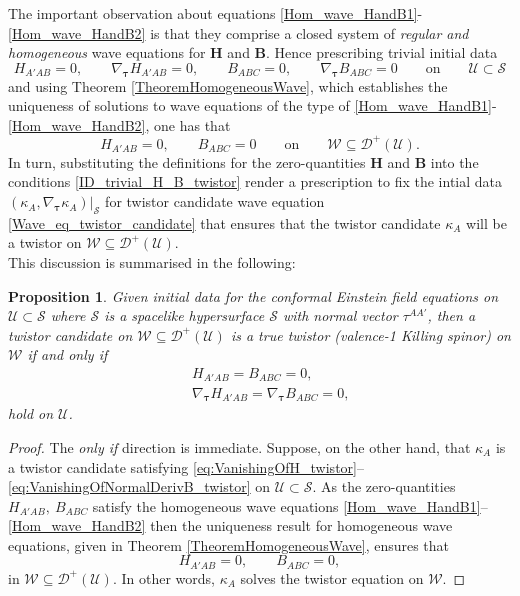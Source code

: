 \documentclass[10pt,a4paper]{article}
\theoremstyle{plain}
\newtheorem{proposition}{Proposition}
\def\bmB{{\bm B}}
\def\bmH{{\bm H}}
\begin{document}
The important observation about equations
\eqref{Hom_wave_HandB1}-\eqref{Hom_wave_HandB2} is that they comprise
a closed system of \emph{regular and homogeneous} wave equations for
$\bmH$ and $\bmB$.  Hence prescribing trivial initial data
\[
H_{A'AB}=0, \qquad \nabla_{\bm\tau} H_{A'AB}=0, \qquad B_{ABC}=0,
\qquad \nabla_{\bm\tau} B_{ABC}=0 \qquad \text{on} \qquad
\mathcal{U}\subset\mathcal{S}
\]
and using Theorem \ref{TheoremHomogeneousWave}, which establishes the
uniqueness of solutions to wave equations of the type of
\eqref{Hom_wave_HandB1}-\eqref{Hom_wave_HandB2}, one has that
\begin{equation}\label{ID_trivial_H_B_twistor}
H_{A'AB}=0, \qquad B_{ABC}=0 \qquad \text{on} \qquad \mathcal{W}\subseteq
\mathcal{D}^{+}(\mathcal{U}) .
\end{equation}
In turn, substituting the definitions for the zero-quantities $\bmH$
and $\bmB$ into the conditions \eqref{ID_trivial_H_B_twistor} render a
prescription to fix the intial data $(\kappa_A, \nabla_{\bm\tau}
\kappa_A)|_\mathcal{S}$ for twistor candidate wave equation
\eqref{Wave_eq_twistor_candidate} that ensures that the twistor
candidate $\kappa_A$ will be a twistor on
$\mathcal{W}\subseteq \mathcal{D}^{+}(\mathcal{U})$.
\\

This discussion is summarised in the following:
\begin{proposition}\label{Prop:Propagation_twistor}
  Given initial data for the conformal Einstein field equations on
  $\mathcal{U}\subset\mathcal{S}$ where $\mathcal{S}$ is a spacelike
  hypersurface $\mathcal{S}$ with normal vector $\tau^{AA'}$, then a
  twistor candidate on
  $\mathcal{W}\subseteq\mathcal{D}^{+}(\mathcal{U})$ is a true twistor
  (valence-1 Killing spinor) on $\mathcal{W}$ if and only if
\begin{subequations}
\begin{eqnarray}
  &&
  H_{A'AB}=B_{ABC}=0,\label{eq:VanishingOfH_twistor}\\ &&\nabla_{\bm\tau}H_{A'AB}=\nabla_{\bm\tau}
  B_{ABC}=0, \label{eq:VanishingOfNormalDerivB_twistor}
\end{eqnarray}
\end{subequations}
hold on $\mathcal{U}$.
\end{proposition}
\begin{proof}
The \emph{only if} direction is immediate. Suppose, on the other hand,
that $\kappa_A$ is a twistor candidate satisfying
\eqref{eq:VanishingOfH_twistor}--\eqref{eq:VanishingOfNormalDerivB_twistor}
on $\mathcal{U}\subset\mathcal{S}$.  As the zero-quantities
$H_{A'AB},~B_{ABC}$ satisfy the homogeneous wave equations
\eqref{Hom_wave_HandB1}--\eqref{Hom_wave_HandB2} then the uniqueness
result for homogeneous wave equations, given in Theorem
\ref{TheoremHomogeneousWave}, ensures that
\[ H_{A'AB}=0,\qquad B_{ABC}=0,\]
in $\mathcal{W}\subseteq\mathcal{D}^{+}(\mathcal{U})$.
In other words, $\kappa_{A}$ solves
the twistor equation on
$\mathcal{W}$.
\end{proof}
\end{document}
